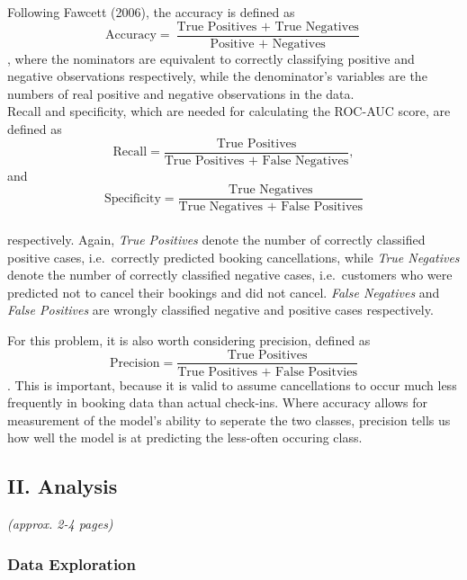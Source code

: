 \documentclass[
]{article}
\begin{document}
Following Fawcett (2006), the accuracy is defined as
\[\text{Accuracy} = \frac{\text{True Positives } + \text{ True Negatives}}{\text{Positive } + \text{ Negatives}}\],
where the nominators are equivalent to correctly classifying positive
and negative observations respectively, while the denominator's
variables are the numbers of real positive and negative observations in
the data.\\
Recall and specificity, which are needed for calculating the ROC-AUC
score, are defined as
\[\text{Recall} = \frac{\text{True Positives}}{\text{True Positives } + \text{ False Negatives}},\]
and\\
\[\text{Specificity} = \frac{\text{True Negatives}}{\text{True Negatives + False Positives}}\]\\
respectively. Again, \emph{True Positives} denote the number of
correctly classified positive cases, i.e.~correctly predicted booking
cancellations, while \emph{True Negatives} denote the number of
correctly classified negative cases, i.e.~customers who were predicted
not to cancel their bookings and did not cancel. \emph{False Negatives}
and \emph{False Positives} are wrongly classified negative and positive
cases respectively.

For this problem, it is also worth considering precision, defined as
\[\text{Precision} = \frac{\text{True Positives}}{\text{True Positives + False Positvies}}\].
This is important, because it is valid to assume cancellations to occur
much less frequently in booking data than actual check-ins. Where
accuracy allows for measurement of the model's ability to seperate the
two classes, precision tells us how well the model is at predicting the
less-often occuring class.

\hypertarget{ii.-analysis}{%
\subsection{II. Analysis}\label{ii.-analysis}}

\emph{(approx. 2-4 pages)}

\hypertarget{data-exploration}{%
\subsubsection{Data Exploration}\label{data-exploration}}
\end{document}
